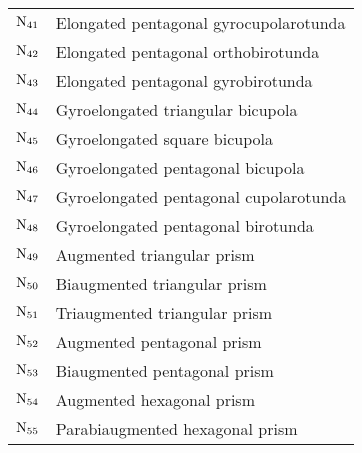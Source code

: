 \begin{table}[htbp]
\begin{center}
\begin{tabular}{l|l}
$\mbox{N$_{41}$}$ & Elongated pentagonal gyro\-cupola\-rotunda \\
$\mbox{N$_{42}$}$ & Elongated pentagonal ortho\-bi\-rotunda \\
$\mbox{N$_{43}$}$ & Elongated pentagonal gyro\-bi\-rotunda \\
$\mbox{N$_{44}$}$ & Gyro\-elongated triangular bi\-cupola \\
$\mbox{N$_{45}$}$ & Gyro\-elongated square bi\-cupola \\
$\mbox{N$_{46}$}$ & Gyro\-elongated pentagonal bi\-cupola \\
$\mbox{N$_{47}$}$ & Gyro\-elongated pentagonal cupola\-rotunda \\
$\mbox{N$_{48}$}$ & Gyro\-elongated pentagonal bi\-rotunda \\
$\mbox{N$_{49}$}$ & Augmented triangular prism \\
$\mbox{N$_{50}$}$ & Bi\-augmented triangular prism \\
$\mbox{N$_{51}$}$ & Tri\-augmented triangular prism \\
$\mbox{N$_{52}$}$ & Augmented pentagonal prism \\
$\mbox{N$_{53}$}$ & Bi\-augmented pentagonal prism \\
$\mbox{N$_{54}$}$ & Augmented hexagonal prism \\
$\mbox{N$_{55}$}$ & Para\-bi\-augmented hexagonal prism \\
\hline
\end{tabular}
\end{center}
\end{table}

\newpage

